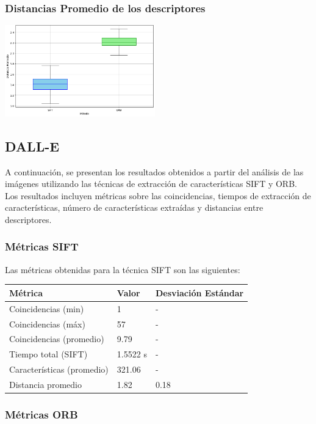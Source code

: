 \documentclass[unnumsec,webpdf,modern,large]{mam-authoring-template}
\theoremstyle{thmstyleone}%
\theoremstyle{thmstyletwo}%
\theoremstyle{thmstylethree}%
\begin{document}
\subsubsection{Distancias Promedio de los descriptores}
\includegraphics[width=6.5cm]{1.1.2.png}


\subsection{DALL-E}
A continuación, se presentan los resultados obtenidos a partir del análisis de las imágenes utilizando las técnicas de extracción de características SIFT y ORB. Los resultados incluyen métricas sobre las coincidencias, tiempos de extracción de características, número de características extraídas y distancias entre descriptores.

\subsubsection{Métricas SIFT}

Las métricas obtenidas para la técnica SIFT son las siguientes:

\begin{center}
    \begin{tabular}{| m{7em} | m{1.5cm} | m{1.5cm} |}
    \hline 
    \textbf{Métrica} & \textbf{Valor} & \textbf{Desviación Estándar} \\
    \hline 
    Coincidencias (min) & 1 & - \\
    \hline 
    Coincidencias (máx) & 57 & - \\
    \hline 
    Coincidencias (promedio) & 9.79 & - \\
    \hline 
    Tiempo total (SIFT) & 1.5522 s & - \\
    \hline 
    Características (promedio) & 321.06 & - \\
    \hline 
    Distancia promedio & 1.82 & 0.18 \\
    \hline 
    \end{tabular}
\end{center}

\subsubsection{Métricas ORB}
\end{document}
